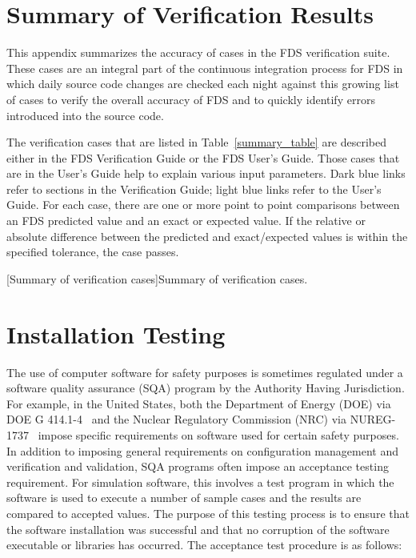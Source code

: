 \documentclass[11pt]{book}
\begin{document}



\appendix

\chapter{Summary of Verification Results}
\label{info:verification_statistics}

This appendix summarizes the accuracy of cases in the FDS verification suite. These cases are an integral part of the continuous integration process for FDS in which daily source code changes are checked each night against this growing list of cases to verify the overall accuracy of FDS and to quickly identify errors introduced into the source code.

The verification cases that are listed in Table~\ref{summary_table} are described either in the FDS Verification Guide or the FDS User's Guide. Those cases that are in the User's Guide help to explain various input parameters. Dark blue links refer to sections in the Verification Guide; light blue links refer to the User's Guide. For each case, there are one or more point to point comparisons between an FDS predicted value and an exact or expected value. If the relative or absolute difference between the predicted and exact/expected values is within the specified tolerance, the case passes.

\begin{landscape}
[Summary of verification cases]{Summary of verification cases.} \label{summary_table}
\end{landscape}



\chapter{Installation Testing}
\label{info:installation_testing}

The use of computer software for safety purposes is sometimes regulated under a software quality assurance (SQA) program by the Authority Having Jurisdiction.  For example, in the United States, both the Department of Energy (DOE) via DOE G 414.1-4~\cite{DOE_G_414} and the Nuclear Regulatory Commission (NRC) via NUREG-1737~\cite{NUREG_1737} impose specific requirements on software used for certain safety purposes.  In addition to imposing general requirements on configuration management and verification and validation, SQA programs often impose an acceptance testing requirement.  For simulation software, this involves a test program in which the software is used to execute a number of sample cases and the results are compared to accepted values.  The purpose of this testing process is to ensure that the software installation was successful and that no corruption of the software executable or libraries has occurred. The acceptance test procedure is as follows:
\end{document}
